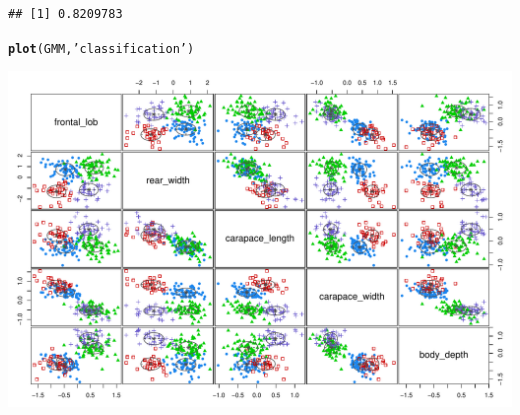\documentclass{beamer}\usepackage[]{graphicx}\usepackage[]{color}
\makeatletter
\newcommand{\hlstr}[1]{\textcolor[rgb]{0.192,0.494,0.8}{#1}}%
\newcommand{\hlstd}[1]{\textcolor[rgb]{0.345,0.345,0.345}{#1}}%
\newcommand{\hlkwd}[1]{\textcolor[rgb]{0.737,0.353,0.396}{\textbf{#1}}}%
\newenvironment{kframe}{%
 \def\at@end@of@kframe{}%
 \ifinner\ifhmode%
  \def\at@end@of@kframe{\end{minipage}}%
  \begin{minipage}{\columnwidth}%
 \fi\fi%
 \def\FrameCommand##1{\hskip\@totalleftmargin \hskip-\fboxsep
 \colorbox{shadecolor}{##1}\hskip-\fboxsep
     \hskip-\linewidth \hskip-\@totalleftmargin \hskip\columnwidth}%
 \MakeFramed {\advance\hsize-\width
   \@totalleftmargin\z@ \linewidth\hsize
   \@setminipage}}%
 {\par\unskip\endMakeFramed%
 \at@end@of@kframe}
\newenvironment{knitrout}{}{} %
\makeatother
\begin{document}
\begin{frame}
\begin{knitrout}
\begin{kframe}
\begin{alltt}
\end{alltt}
\begin{verbatim}
## [1] 0.8209783
\end{verbatim}
\begin{alltt}
\hlkwd{plot}\hlstd{(GMM,} \hlstr{'classification'}\hlstd{)}
\end{alltt}
\end{kframe}
\includegraphics[width=.8\textwidth]{figures/GMM-2} 

\end{knitrout}

\end{frame}


\end{document}
